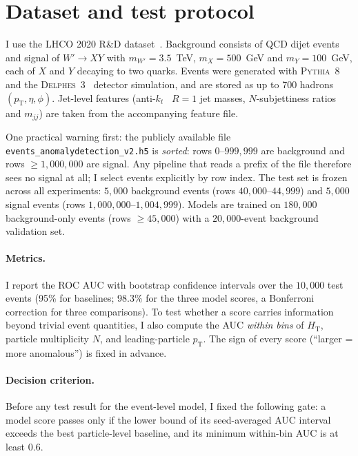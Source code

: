 \documentclass[11pt,a4paper]{article}
\newcommand{\pt}{\ensuremath{p_\mathrm{T}}\xspace}
\newcommand{\HT}{\ensuremath{H_\mathrm{T}}\xspace}
\newcommand{\mjj}{\ensuremath{m_{jj}}\xspace}
\begin{document}
\section{Dataset and test protocol}
\label{sec:data}

I use the LHCO 2020 R\&D dataset~\cite{Kasieczka:2021xcg,LHCO:zenodo}. Background consists of
QCD dijet events and signal of $W'\to XY$ with $m_{W'}=3.5$~TeV, $m_X=500$~GeV and
$m_Y=100$~GeV, each of $X$ and $Y$ decaying to two quarks. Events were generated with
\textsc{Pythia}~8~\cite{Sjostrand:2014zea} and the \textsc{Delphes}~3~\cite{deFavereau:2013fsa}
detector simulation, and are stored as up to 700 hadrons
$(\pt,\eta,\phi)$. Jet-level features (anti-$k_t$~\cite{Cacciari:2008gp} $R=1$ jet masses,
$N$-subjettiness ratios~\cite{Thaler:2010tr} and \mjj) are taken from the accompanying
feature file.

One practical warning first: the publicly available file \texttt{events\_anomalydetection\_v2.h5} is \emph{sorted}: rows
$0$--$999{,}999$ are background and rows $\geq 1{,}000{,}000$ are signal. Any pipeline that
reads a prefix of the file therefore sees no signal at all; I select events explicitly by row
index. The test set is frozen across all experiments: $5{,}000$ background events
(rows $40{,}000$--$44{,}999$) and $5{,}000$ signal events (rows $1{,}000{,}000$--$1{,}004{,}999$).
Models are trained on $180{,}000$ background-only events (rows $\geq 45{,}000$) with a
$20{,}000$-event background validation set.

\paragraph{Metrics.}
I report the ROC AUC with bootstrap confidence intervals over the $10{,}000$ test events
(95\% for baselines; 98.3\% for the three model scores, a Bonferroni correction for three
comparisons). To test whether a score carries information beyond trivial event quantities,
I also compute the AUC \emph{within bins} of \HT, particle multiplicity $N$, and leading-particle
\pt. The sign of every score (``larger = more anomalous'') is fixed in advance.

\paragraph{Decision criterion.}
Before any test result for the event-level model, I fixed the following gate: a model score
passes only if the lower bound of its seed-averaged AUC interval exceeds the best particle-level
baseline, and its minimum within-bin AUC is at least $0.6$.
\end{document}
